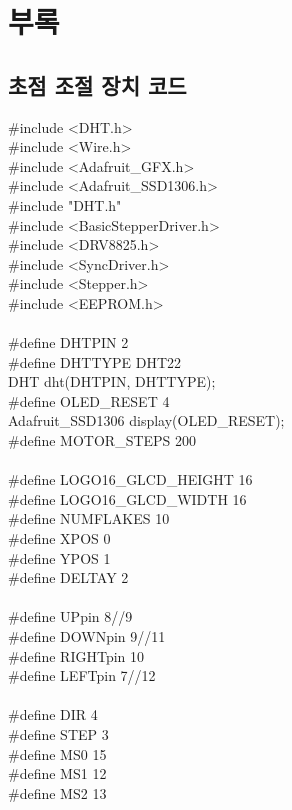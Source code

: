\section{부록}

\subsection{초점 조절 장치 코드}

\#include <DHT.h>\\
\#include <Wire.h>\\
\#include <Adafruit\_GFX.h>\\
\#include <Adafruit\_SSD1306.h>\\
\#include "DHT.h"\\
\#include <BasicStepperDriver.h>\\
\#include <DRV8825.h>\\
\#include <SyncDriver.h>\\
\#include <Stepper.h>\\
\#include <EEPROM.h>\\
\\
\#define DHTPIN 2\\
\#define DHTTYPE DHT22\\
DHT dht(DHTPIN, DHTTYPE);\\
\#define OLED\_RESET 4\\
Adafruit\_SSD1306 display(OLED\_RESET);\\
\#define MOTOR\_STEPS 200\\
\\
\#define LOGO16\_GLCD\_HEIGHT 16 \\
\#define LOGO16\_GLCD\_WIDTH 16\\
\#define NUMFLAKES 10\\
\#define XPOS 0\\
\#define YPOS 1\\
\#define DELTAY 2\\
\\
\#define UPpin 8//9\\
\#define DOWNpin 9//11\\
\#define RIGHTpin 10\\
\#define LEFTpin 7//12\\
\\
\#define DIR 4\\
\#define STEP 3\\
\#define MS0 15\\
\#define MS1 12\\
\#define MS2 13\\
